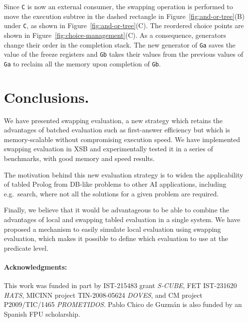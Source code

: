 \documentclass{./tlp}
\newcommand{\redsect}{\vspace{-1em}}
\begin{document}
Since \lstinline{C} is now an external consumer,
the swapping operation is performed to move the execution subtree in
the dashed rectangle in Figure~\ref{fig:and-or-tree}(B) under
\lstinline{C}, as shown in
Figure~\ref{fig:and-or-tree}(C). The reordered choice points are shown
in Figure~\ref{fig:choice-management}(C). As a consequence, generators
change their order in the completion stack. The new generator of
\lstinline{Ga} saves the value of the freeze registers and \lstinline{Gb}
takes their values from the previous values of \lstinline{Ga} to
reclaim all the memory upon completion of \lstinline{Gb}.



\redsect
\section{Conclusions.} 
 
We have presented swapping evaluation, a new strategy which retains
the advantages of batched evaluation such as first-answer efficiency
but which is memory-scalable without compromising execution speed.  We
have implemented swapping evaluation in XSB and experimentally tested
it in a series of benchmarks, with good memory and speed results.



The motivation behind this new evaluation strategy is to widen the
applicability of tabled Prolog from DB-like problems to other AI
applications, including e.g.\ search, where not all the solutions for a
given problem are required.



Finally, we believe that it would be advantageous to be able
to combine the advantages of local and swapping tabled evaluation in a
single system.  We have proposed a mechanism to easily simulate local
evaluation using swapping evaluation, which makes it possible to
define which evaluation to use at the predicate level.




\paragraph{\textbf{Acknowledgments:}} 
This work was funded in part by
IST-215483 grant {\em S-CUBE}, FET IST-231620 {\em HATS}, MICINN
project TIN-2008-05624 {\em DOVES}, and CM project P2009/TIC/1465
\emph{PROMETIDOS}.  Pablo Chico de Guzm\'an is also funded by an
Spanish FPU scholarship.
 
 



\label{lastpage} 
 
\end{document}
